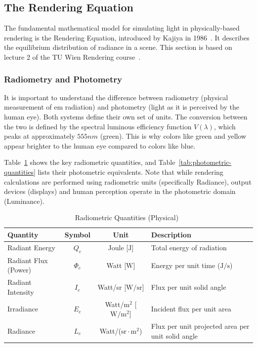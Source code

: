 \subsection{The Rendering Equation}\label{subsec:rendering-equation}

The fundamental mathematical model for simulating light in physically-based rendering is the Rendering Equation,
introduced by Kajiya in 1986~\cite{10.1145/15886.15902}.
It describes the equilibrium distribution of radiance in a scene.
This section is based on lecture 2 of the TU Wien Rendering course~\cite{tuwien_rendering_2020}.

\subsubsection{Radiometry and Photometry}\label{subsubsec:radiometry-photometry}

It is important to understand the difference between radiometry (physical measurement of \gls{em} radiation)
and photometry (light as it is perceived by the human eye).
Both systems define their own set of units.
The conversion between the two is defined by the spectral luminous efficiency function $V(\lambda)$,
which peaks at approximately $555nm$ (green).
This is why colors like green and yellow appear brighter to the human eye compared to colors like blue.

Table~\ref{tab:radiometric-quantities} shows the key radiometric quantities,
and Table~\ref{tab:photometric-quantities} lists their photometric equivalents.
Note that while rendering calculations are performed using radiometric units (specifically Radiance),
output devices (displays) and human perception operate in the photometric domain (Luminance).

\begin{table}
    \centering
    \caption{Radiometric Quantities (Physical)~\cite{tuwien_rendering_2020}}
    \label{tab:radiometric-quantities}
    \begin{tabular}{lccl}
        \toprule
        \textbf{Quantity} & \textbf{Symbol} & \textbf{Unit} & \textbf{Description} \\
        \midrule
        Radiant Energy & $Q_e$ & Joule [$\mathrm{J}$] & Total energy of radiation \\
        Radiant Flux (Power) & $\Phi_e$ & Watt [$\mathrm{W}$] & Energy per unit time ($\mathrm{J/s}$) \\
        Radiant Intensity & $I_e$ & Watt/sr [$\mathrm{W/sr}$] & Flux per unit solid angle \\
        Irradiance & $E_e$ & Watt/$\mathrm{m}^2$ [$\mathrm{W/m^2}$] & Incident flux per unit area \\
        Radiance & $L_e$ & Watt/($\mathrm{sr} \cdot \mathrm{m}^2$) & Flux per unit projected area per unit solid angle \\
        \bottomrule
    \end{tabular}
\end{table}

